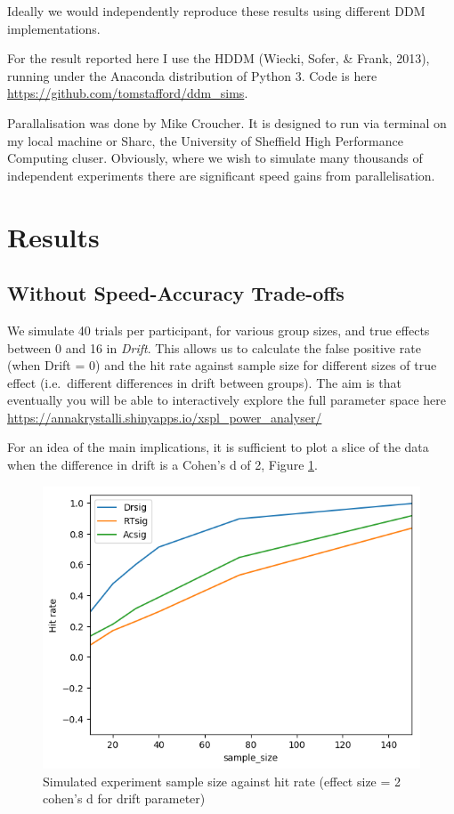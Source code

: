 \documentclass[floatsintext,doc]{apa6}
\theoremstyle{definition}
\theoremstyle{definition}
\theoremstyle{definition}
\theoremstyle{remark}
\begin{document}
Ideally we would independently reproduce these results using different
DDM implementations.

For the result reported here I use the HDDM (Wiecki, Sofer, \& Frank,
2013), running under the Anaconda distribution of Python 3. Code is here
\url{https://github.com/tomstafford/ddm_sims}.

Parallalisation was done by Mike Croucher. It is designed to run via
terminal on my local machine or Sharc, the University of Sheffield High
Performance Computing cluser. Obviously, where we wish to simulate many
thousands of independent experiments there are significant speed gains
from parallelisation.

\section{Results}\label{results}

\subsection{Without Speed-Accuracy
Trade-offs}\label{without-speed-accuracy-trade-offs}

We simulate 40 trials per participant, for various group sizes, and true
effects between 0 and 16 in \emph{Drift}. This allows us to calculate
the false positive rate (when Drift = 0) and the hit rate against sample
size for different sizes of true effect (i.e.~different differences in
drift between groups). The aim is that eventually you will be able to
interactively explore the full parameter space here
\url{https://annakrystalli.shinyapps.io/xspl_power_analyser/}

For an idea of the main implications, it is sufficient to plot a slice
of the data when the difference in drift is a Cohen's d of 2, Figure
\ref{fig:vanillahits}.

\begin{figure}

{\centering \includegraphics[width=0.68\linewidth]{figs/HitRate} 

}

\caption{Simulated experiment sample size against hit rate (effect size = 2 cohen's d for drift parameter)}\label{fig:vanillahits}
\end{figure}
\end{document}
